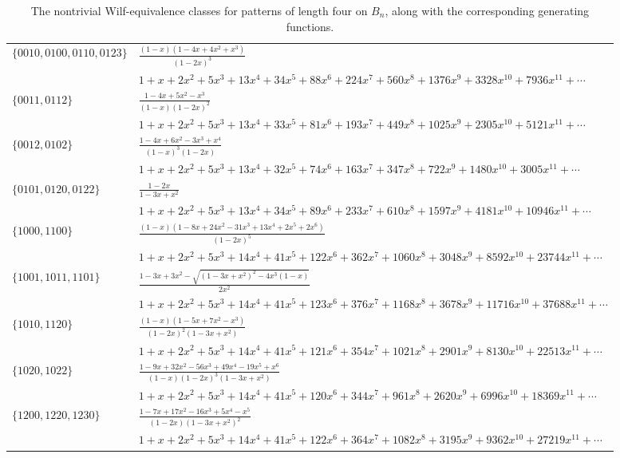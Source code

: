\documentclass{article}
\theoremstyle{remark}
\theoremstyle{plain}
\begin{document}
\begin{table}[htp]
{\fontsize{7}{7}\selectfont
\begin{tabular}{|l|l|}\hline
$\{0010,0100,0110,0123\}$& $\frac{(1-x)(1-4x+4x^2+x^3)}{(1-2x)^3}$\\
&$1+x+2x^2+5x^3+13x^4+34x^5+88x^6+224x^7+560x^8+1376x^9+3328x^{10}+7936x^{11}+\cdots$\\\hline
$\{0011,0112\}$&$\frac{1-4x+5x^2-x^3}{(1-x)(1-2x)^2}$\\
&$1+x+2x^2+5x^3+13x^4+33x^5+81x^6+193x^7+449x^8+1025x^9+2305x^{10}+5121x^{11}+\cdots$\\\hline
$\{0012,0102\}$& $\frac{1-4x+6x^2-3x^3+x^4}{(1-x)^3(1-2x)}$\\
&$1+x+2x^2+5x^3+13x^4+32x^5+74x^6+163x^7+347x^8+722x^9+1480x^{10}+3005x^{11}+\cdots$\\\hline
$\{0101,0120,0122\}$& $\frac{1-2x}{1-3x+x^2}$\\
&$1+x+2x^2+5x^3+13x^4+34x^5+89x^6+233x^7+610x^8+1597x^9+4181x^{10}+10946x^{11}+\cdots$\\\hline
$\{1000,1100\}$& $\frac{(1-x)(1-8x+24x^2-31x^3+13x^4+2x^5+2x^6)}{(1-2x)^5}$\\
&$1+x+2x^2+5x^3+14x^4+41x^5+122x^6+362x^7+1060x^8+3048x^9+8592x^{10}+23744x^{11}+\cdots$\\\hline
$\{1001,1011,1101\}$& $\frac{1-3x+3x^2-\sqrt{(1-3x+x^2)^2-4x^3(1-x)}}{2x^2}$\\
&$1+x+2x^2+5x^3+14x^4+41x^5+123x^6+376x^7+1168x^8+3678x^9+11716x^{10}+37688x^{11}+\cdots$\\\hline
$\{1010,1120\}$&$\frac{(1-x)(1-5x+7x^2-x^3)}{(1-2x)^2(1-3x+x^2)}$\\
&$1+x+2x^2+5x^3+14x^4+41x^5+121x^6+354x^7+1021x^8+2901x^9+8130x^{10}+22513x^{11}+\cdots$\\\hline
$\{1020,1022\}$& $\frac{1-9x+32x^2-56x^3+49x^4-19x^5+x^6}{(1-x)(1-2x)^3(1-3x+x^2)}$\\
&$1+x+2x^2+5x^3+14x^4+41x^5+120x^6+344x^7+961x^8+2620x^9+6996x^{10}+18369x^{11}+\cdots$\\\hline
$\{1200,1220,1230\}$& $\frac{1-7x+17x^2-16x^3+5x^4-x^5}{(1-2x)(1-3x+x^2)^2}$\\
&$1+x+2x^2+5x^3+14x^4+41x^5+122x^6+364x^7+1082x^8+3195x^9+9362x^{10}+27219x^{11}+\cdots$\\\hline
\end{tabular}}
\caption{The nontrivial Wilf-equivalence classes for patterns of length four on $B_n$, along with the corresponding generating functions.}\label{tab1}
\end{table}
\end{document}
